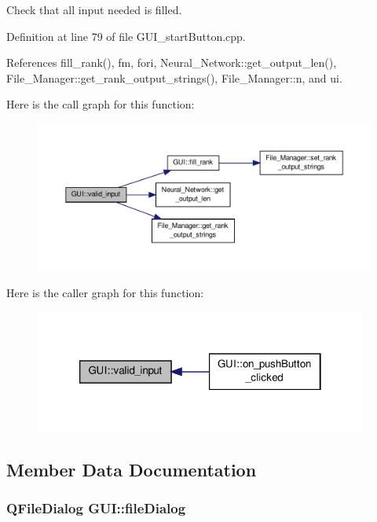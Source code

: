 Check that all input needed is filled. 



Definition at line 79 of file G\-U\-I\-\_\-start\-Button.\-cpp.



References fill\-\_\-rank(), fm, fori, Neural\-\_\-\-Network\-::get\-\_\-output\-\_\-len(), File\-\_\-\-Manager\-::get\-\_\-rank\-\_\-output\-\_\-strings(), File\-\_\-\-Manager\-::n, and ui.



Here is the call graph for this function\-:\nopagebreak
\begin{figure}[H]
\begin{center}
\leavevmode
\includegraphics[width=350pt]{d7/d46/a00002_a5ec9d8a051303b218c4542f96a87b56f_cgraph}
\end{center}
\end{figure}




Here is the caller graph for this function\-:\nopagebreak
\begin{figure}[H]
\begin{center}
\leavevmode
\includegraphics[width=310pt]{d7/d46/a00002_a5ec9d8a051303b218c4542f96a87b56f_icgraph}
\end{center}
\end{figure}




\subsection{Member Data Documentation}
\hypertarget{a00002_a9ed0a8b583419e88bb94697a9b258c72}{
\subsubsection[{file\-Dialog}]{\setlength{\rightskip}{0pt plus 5cm}Q\-File\-Dialog G\-U\-I\-::file\-Dialog\hspace{0.3cm}{\ttfamily [private]}}}\label{d7/d46/a00002_a9ed0a8b583419e88bb94697a9b258c72}



